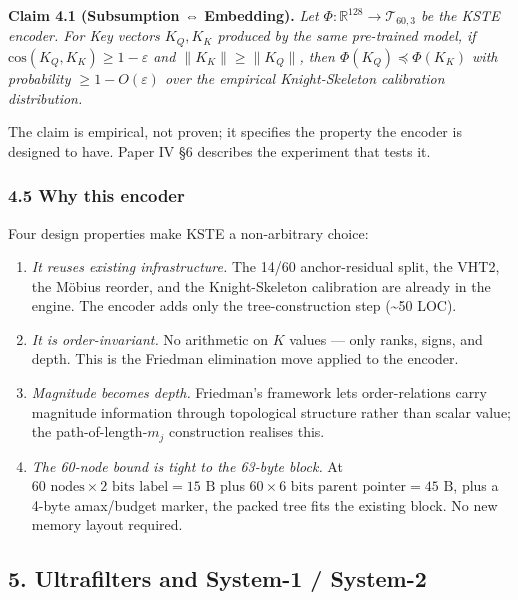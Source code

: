 \documentclass[
  11pt,
]{article}
\providecommand{\tightlist}{%
  \setlength{\itemsep}{0pt}\setlength{\parskip}{0pt}}
\begin{document}
\textbf{Claim 4.1 (Subsumption ⇔ Embedding).} \emph{Let
\(\Phi: \mathbb{R}^{128} \to \mathcal{T}_{60,3}\) be the KSTE encoder.
For Key vectors \(K_Q, K_K\) produced by the same pre-trained model, if
\(\mathrm{cos}(K_Q, K_K) \ge 1 - \varepsilon\) and
\(\|K_K\| \ge \|K_Q\|\), then \(\Phi(K_Q) \preceq \Phi(K_K)\) with
probability \(\ge 1 - O(\varepsilon)\) over the empirical
Knight-Skeleton calibration distribution.}

The claim is empirical, not proven; it specifies the property the
encoder is designed to have. Paper IV §6 describes the experiment that
tests it.

\hypertarget{why-this-encoder}{%
\subsubsection{4.5 Why this encoder}\label{why-this-encoder}}

Four design properties make KSTE a non-arbitrary choice:

\begin{enumerate}
\def\labelenumi{\arabic{enumi}.}
\tightlist
\item
  \emph{It reuses existing infrastructure.} The 14/60 anchor-residual
  split, the VHT2, the Möbius reorder, and the Knight-Skeleton
  calibration are already in the engine. The encoder adds only the
  tree-construction step (\textasciitilde50 LOC).
\item
  \emph{It is order-invariant.} No arithmetic on \(K\) values --- only
  ranks, signs, and depth. This is the Friedman elimination move applied
  to the encoder.
\item
  \emph{Magnitude becomes depth.} Friedman's framework lets
  order-relations carry magnitude information through topological
  structure rather than scalar value; the path-of-length-\(m_j\)
  construction realises this.
\item
  \emph{The 60-node bound is tight to the 63-byte block.} At
  \(60 \text{ nodes} \times 2 \text{ bits label} = 15 \text{ B}\) plus
  \(60 \times 6 \text{ bits parent pointer} = 45 \text{ B}\), plus a
  4-byte amax/budget marker, the packed tree fits the existing block. No
  new memory layout required.
\end{enumerate}

\hypertarget{ultrafilters-and-system-1-system-2}{%
\subsection{5. Ultrafilters and System-1 /
System-2}\label{ultrafilters-and-system-1-system-2}}
\end{document}
